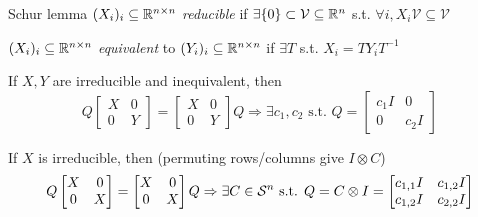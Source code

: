 \begin{frame}{Schur lemma}
  \noindent$(X_i)_i\subseteq \mathbb{R}^{n \times n}$ \emph{reducible} if $\exists \{0\} \subset \mathcal{V} \subseteq \mathbb{R}^n$ s.t. $\forall i, X_i \mathcal{V} \subseteq \mathcal{V}$

  \noindent$(X_i)_i\subseteq \mathbb{R}^{n \times n}$ \emph{equivalent} to $(Y_i)_i\subseteq \mathbb{R}^{n \times n}$ if $\exists T$ s.t. $X_i = TY_iT^{-1}$

  If $X, Y$ are irreducible and inequivalent, then
  $$
  Q
  \begin{bmatrix}
    X & 0\\
    0 & Y
  \end{bmatrix}
    =
  \begin{bmatrix}
    X & 0\\
    0 & Y
  \end{bmatrix}
  Q
  \Rightarrow
  \exists c_1, c_2 \text{ s.t. }
  Q =
  \begin{bmatrix}
    c_1 I & 0\\
    0 & c_2 I
  \end{bmatrix}
  $$

  If $X$ is irreducible, then (permuting rows/columns give
  $I \otimes C$)
  $$
  Q
  \begin{bmatrix}
    X & 0\\
    0 & X
  \end{bmatrix}
    =
  \begin{bmatrix}
    X & 0\\
    0 & X
  \end{bmatrix}
  Q
  \Rightarrow
  \exists C \in \mathcal{S}^n \text{ s.t. }
  Q = C \otimes I =
  \begin{bmatrix}
    c_{1,1}I & c_{1,2}I\\
    c_{1,2}I & c_{2,2}I
  \end{bmatrix}
  $$

\end{frame}

